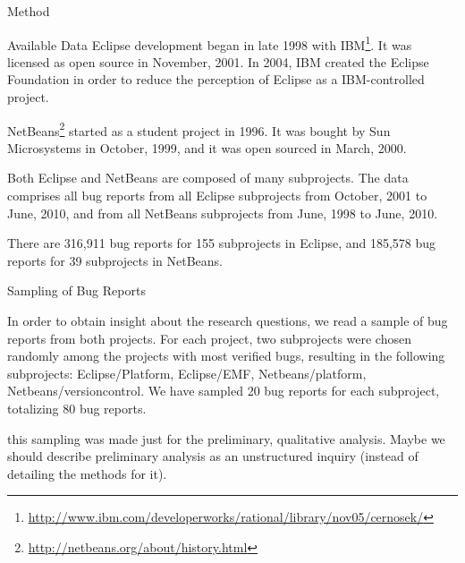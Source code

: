 \begin{section}{Method}
\begin{subsection}{Available Data}
	Eclipse development began in late 1998 with IBM\footnote{\url{http://www.ibm.com/developerworks/rational/library/nov05/cernosek/}}. It was licensed as open source in November, 2001. In 2004, IBM created the Eclipse Foundation in order to reduce the perception of Eclipse as a IBM-controlled project.
	
	NetBeans\footnote{\url{http://netbeans.org/about/history.html}} started  as a student project in 1996. It was bought by Sun Microsystems in October, 1999, and it was open sourced in March, 2000.

	Both Eclipse and NetBeans are composed of many subprojects. The data comprises all bug reports from all Eclipse subprojects from October, 2001 to June, 2010, and from all NetBeans subprojects from June, 1998 to June, 2010.
	
	There are 316,911 bug reports for 155 subprojects in Eclipse, and 185,578 bug reports for 39 subprojects in NetBeans.
	
\end{subsection}

\begin{subsection}{Sampling of Bug Reports}
	
	In order to obtain insight about the research questions, we read a sample of bug reports from both projects. For each project, two subprojects were chosen randomly among the projects with most verified bugs, resulting in the following subprojects: Eclipse/Platform, Eclipse/EMF, Netbeans/platform, Netbeans/versioncontrol. We have sampled 20 bug reports for each subproject, totalizing 80 bug reports.
	
	\TODO this sampling was made just for the preliminary, qualitative analysis. Maybe we should describe preliminary analysis as an unstructured inquiry (instead of detailing the methods for it).
	
\end{subsection}

\end{section}


